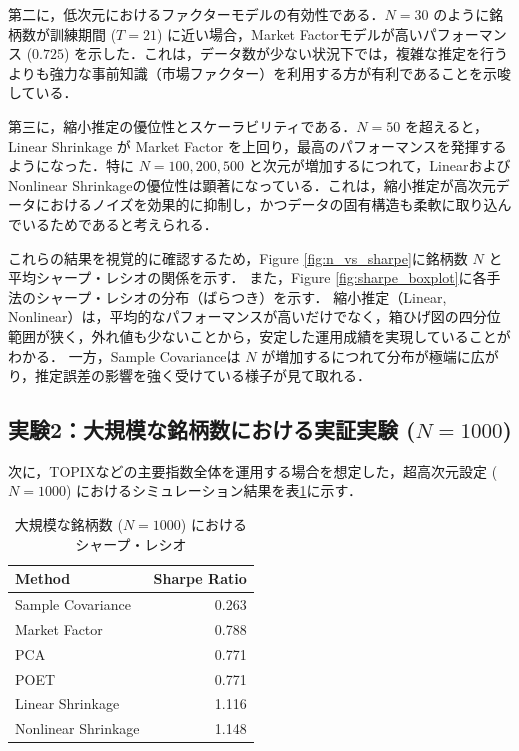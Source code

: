 \documentclass[lualatex,a4paper,11pt]{jlreq}
\begin{document}
第二に，低次元におけるファクターモデルの有効性である．$N=30$ のように銘柄数が訓練期間 ($T=21$) に近い場合，Market Factorモデルが高いパフォーマンス ($0.725$) を示した．これは，データ数が少ない状況下では，複雑な推定を行うよりも強力な事前知識（市場ファクター）を利用する方が有利であることを示唆している．

第三に，縮小推定の優位性とスケーラビリティである．$N=50$ を超えると，Linear Shrinkage が Market Factor を上回り，最高のパフォーマンスを発揮するようになった．特に $N=100, 200, 500$ と次元が増加するにつれて，LinearおよびNonlinear Shrinkageの優位性は顕著になっている．これは，縮小推定が高次元データにおけるノイズを効果的に抑制し，かつデータの固有構造も柔軟に取り込んでいるためであると考えられる．

これらの結果を視覚的に確認するため，Figure \ref{fig:n_vs_sharpe}に銘柄数 $N$ と平均シャープ・レシオの関係を示す．
また，Figure \ref{fig:sharpe_boxplot}に各手法のシャープ・レシオの分布（ばらつき）を示す．
縮小推定（Linear, Nonlinear）は，平均的なパフォーマンスが高いだけでなく，箱ひげ図の四分位範囲が狭く，外れ値も少ないことから，安定した運用成績を実現していることがわかる．
一方，Sample Covarianceは $N$ が増加するにつれて分布が極端に広がり，推定誤差の影響を強く受けている様子が見て取れる．

\subsection{実験2：大規模な銘柄数における実証実験 (\texorpdfstring{$N=1000$}{N=1000})}

次に，TOPIXなどの主要指数全体を運用する場合を想定した，超高次元設定 ($N=1000$) におけるシミュレーション結果を表\ref{tab:exp2_result}に示す．

\begin{table}[h]
\centering
\caption{大規模な銘柄数 ($N=1000$) におけるシャープ・レシオ}
\label{tab:exp2_result}
\begin{tabular}{lr}
\hline
Method & Sharpe Ratio \\ \hline
Sample Covariance & 0.263 \\
Market Factor & 0.788 \\
PCA & 0.771 \\
POET & 0.771 \\
Linear Shrinkage & 1.116 \\
Nonlinear Shrinkage & 1.148 \\ \hline
\end{tabular}
\end{table}
\end{document}
